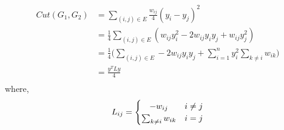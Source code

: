 \documentclass[10pt]{article}
\begin{document}
\begin{itemize}
\[			\]
			\begin{align*}
				Cut(G_{1}, G_{2}) &= \sum_{(i,j) \in E} \frac{w_{ij}}{4}(y_{i} - y_{j})^{2}\\
				&= \frac{1}{4} \sum_{(i,j) \in E} (w_{ij}y_{i}^{2} - 2w_{ij}y_{i}y_{j} + w_{ij}y_{j}^{2})\\
				&= \frac{1}{4}\bigg(\sum_{(i,j) \in E} -2w_{ij}y_{i}y_{j} + \sum_{i=1}^{n} y_{i}^{2} \sum_{k\neq i}w_{ik}\bigg)\\
				&= \frac{y^{T}Ly}{4}\\
			\end{align*} 
			where,
			\[
 				L_{ij} = \left\{\def\arraystretch{1.2}%
 				\begin{array}{@{}c@{\quad}l@{}}
    				-w_{ij} & i \neq j \\
    				\sum_{k\neq i} w_{ik} & i = j \\
  				\end{array}\right.
			\]
			

\end{itemize}
\end{document}
